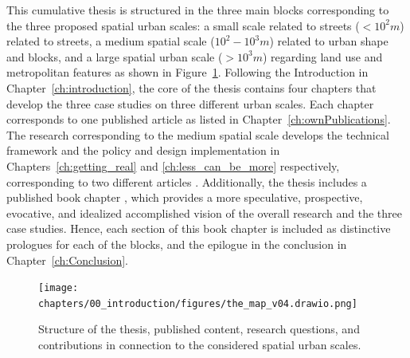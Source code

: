 This cumulative thesis is structured in the three main blocks corresponding to the three proposed spatial urban scales: a small scale related to streets ($<10^2 m$) related to streets, a medium spatial scale ($10^2-10^3 m$) related to urban shape and blocks, and a large spatial urban scale ($>10^3m$) regarding land use and metropolitan features as shown in Figure~\ref{fig:thesis_map}. Following the Introduction in Chapter~\ref{ch:introduction}, the core of the thesis contains four chapters that develop the three case studies on three different urban scales. Each chapter corresponds to one published article as listed in Chapter~\ref{ch:ownPublications}. The research corresponding to the medium spatial scale develops the technical framework and the policy and design implementation in Chapters~\ref{ch:getting_real} and \ref{ch:less_can_be_more} respectively, corresponding to two different articles \citep{ArgotaSanchez-Vaquerizo2021, ArgotaSanchez-Vaquerizo2023LessCity-making}. Additionally, the thesis includes a published book chapter \citep{ArgotaSanchez-Vaquerizo2023_3Tales}, which provides a more speculative, prospective, evocative, and idealized accomplished vision of the overall research and the three case studies. Hence, each section of this book chapter is included as distinctive prologues for each of the blocks, and the epilogue in the conclusion in Chapter~\ref{ch:Conclusion}.

\begin{figure}[htbp!]
    \centering
    \texttt{[image: chapters/00\_introduction/figures/the\_map\_v04.drawio.png]}
    \captionsetup{format=plain, justification=centering} %
    \caption{Structure of the thesis, published content, research questions, and contributions in connection to the considered spatial urban scales.}
   \label{fig:thesis_map}
\end{figure}
\FloatBarrier


